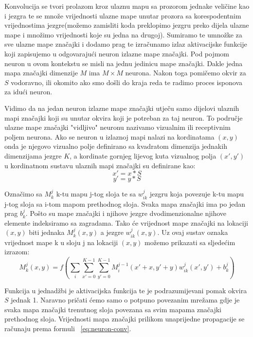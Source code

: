 \documentclass[times, utf8, zavrsni]{fer}
\begin{document}
Konvolucija se tvori prolazom kroz ulaznu mapu sa prozorom jednake veličine kao i jezgra te se množe vrijednosti ulazne mape unutar prozora sa korespodentnim vrijednostima jezgre(možemo zamisliti koda preklopimo jezgru preko dijela ulazne mape i množimo vrijednosti koje su jedna na drugoj). Sumiramo te umnožke za sve ulazne mape značajki i dodamo prag te izračunamo izlaz aktivacijske funkcije koji zapisujemo u odgovarajući neuron izlazne mape značajki. Pod pojmom neuron u ovom kontekstu se misli na jednu jedinicu mape značajki. Dakle jedna mapa značajki dimenzije $M$ ima $M \times M$ neurona. Nakon toga pomičemo okvir za $S$ vodoravno, ili okomito ako smo došli do kraja reda te radimo proces isponova za idući neuron.

Vidimo da na jedan neuron izlazne mape značajki utječu samo dijelovi ulaznih mapi značajki koji su unutar okvira koji je potreban za taj neuron. To područje ulazne mape značajki "vidljivo" neuronu nazivamo vizualnim ili receptivnim poljem neurona. Ako se neuron u izlaznoj mapi nalazi na kordinatama $(x, y)$ onda je njegovo vizualno polje definirano sa kvadratom dimenzija jednakih dimenzijama jezgre $K$, a kordinate gornjeg lijevog kuta vizualnog polja $(x', y')$ u kordinatnom sustavu ulaznih mapi značajki su definirane kao:
\begin{equation}
x' = x*S
\end{equation}
\begin{equation}
y' = y*S
\end{equation}

Označimo sa $M^j_k$ k-tu mapu j-tog sloja te sa $w^j_{ik}$ jezgru koja povezuje k-tu mapu j-tog sloja sa i-tom mapom prethodnog sloja. Svaka mapa značajki ima po jedan prag $b^j_k$. Pošto su mape značajki i njihove jezgre dvodimenzionalne njihove elemente indeksiramo sa zagradama. Tako će vrijednost mape značajki na lokaciji $(x, y)$ biti jednaka $M^j_k (x, y)$ a jezgre $w^j_{ik} (x, y)$. Uz ovaj sustav oznaka vrijednost mape k u sloju j na lokaciji $(x, y)$ možemo prikazati sa sljedećim izrazom:
\begin{equation}\label{eq:neuron-conv}
M^j_k (x, y) = f(\sum_i \sum_{x'=0}^{K-1} \sum_{y'=0}^{K-1} M^{j-1}_i (x' + x, y' + y) w^j_{ik} (x', y') + b^j_k )
\end{equation}

Funkcija u jednadžbi je aktivacijska funkcija te je podrazumijevani pomak okvira $S$ jednak 1. Naravno pričati ćemo samo o potpuno povezanim mrežama gdje je svaka mapa značajki trenutnog sloja povezana sa svim mapama značajki prethodnog sloja. Vrijednosti mapa značajki prilikom unaprijedne propagacije se računaju prema formuli ~\ref{eq:neuron-conv}.
\end{document}
